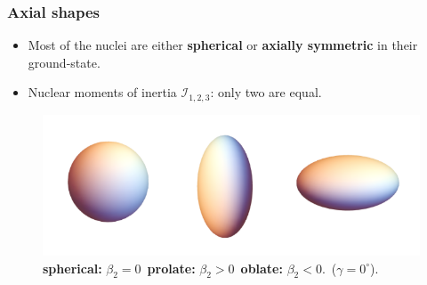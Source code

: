 \documentclass{beamer}
\begin{document}
\begin{frame}
	\frametitle{Axial shapes}
	\vspace{-0.2cm}
	\begin{itemize}
		\item Most of the nuclei are either \textbf{spherical} or \textbf{axially symmetric} in their ground-state. %
		\item Nuclear moments of inertia $\mathcal{I}_{1,2,3}$: only two are equal.
	\end{itemize}
	\vspace{-0.4cm}
	\begin{figure}
		\centering
		\includegraphics[scale=0.38]{figures/nuclear_shapes.png}
		\caption{\textbf{spherical:} $\beta_2=0$\ \textbf{prolate:} $\beta_2>0$\ \textbf{oblate:} $\beta_2<0$.\ ($\gamma=0^\circ$).}
	\end{figure}
\end{frame}
\end{document}
